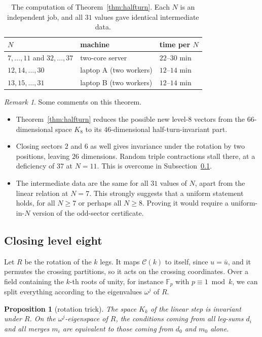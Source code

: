 \documentclass[11pt]{amsart}
\newtheorem{proposition}[theorem]{Proposition}
\theoremstyle{definition}
\theoremstyle{remark}
\newtheorem{remark}[theorem]{Remark}
\theoremstyle{plain}
\numberwithin{equation}{section}
\numberwithin{table}{section}
\newcommand{\F}{\mathbb F}
\begin{document}
\begin{table}[ht]
\centering
\begin{tabular}{@{}lll@{}}
\toprule
$N$ & machine & time per $N$\\
\midrule
$7,\dots,11$ and $32,\dots,37$ & two-core server & $22$--$30$ min\\
$12,14,\dots,30$ & laptop A (two workers) & $12$--$14$ min\\
$13,15,\dots,31$ & laptop B (two workers) & $12$--$14$ min\\
\bottomrule
\end{tabular}
\caption{The computation of Theorem~\ref{thm:halfturn}. Each $N$ is an independent job, and all $31$ values gave identical intermediate data.}
\end{table}

\begin{remark}
Some comments on this theorem.
\begin{itemize}
\item Theorem~\ref{thm:halfturn} reduces the possible new level-$8$ vectors from the $66$-dimensional space $K_8$ to its $46$-dimensional half-turn-invariant part.
\item Closing sectors $2$ and $6$ as well gives invariance under the rotation by two positions, leaving $26$ dimensions. Random triple contractions stall there, at a deficiency of $37$ at $N=11$. This is overcome in Subsection~\ref{sec:closeeight}.
\item The intermediate data are the same for all $31$ values of $N$, apart from the linear relation at $N=7$. This strongly suggests that a uniform statement holds, for all $N\ge7$ or perhaps all $N\ge8$. Proving it would require a uniform-in-$N$ version of the odd-sector certificate.
\end{itemize}
\end{remark}

\subsection{Closing level eight}\label{sec:closeeight}

Let $R$ be the rotation of the $k$ legs. It maps $\mathcal C(k)$ to itself, since $u=\bar u$, and it permutes the crossing partitions, so it acts on the crossing coordinates. Over a field containing the $k$-th roots of unity, for instance $\F_p$ with $p\equiv1\bmod k$, we can split everything according to the eigenvalues $\omega^j$ of $R$.

\begin{proposition}[rotation trick]\label{prop:rotation}
The space $K_k$ of the linear step is invariant under $R$. On the $\omega^j$-eigenspace of $R$, the conditions coming from all leg-sums $d_i$ and all merges $m_i$ are equivalent to those coming from $d_0$ and $m_0$ alone.
\end{proposition}
\end{document}
